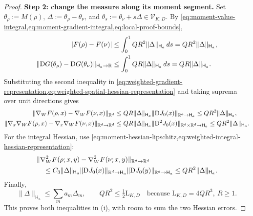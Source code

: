 \begin{proof}
\noindent\textbf{Step 2: change the measure along its moment segment.}
Set $\theta_\rho:=M(\rho)$, $\Delta:=\theta_\rho-\theta_\nu$, and
$\theta_s:=\theta_\nu+s\Delta\in\mathcal V_{K,D}$. By
\cref{eq:moment-value-integral,eq:moment-gradient-integral,eq:local-proof-bounds},
\begin{align*}
 |F(\rho)-F(\nu)|
 &\le\int_0^1QR^2\|\Delta\|_{\mathsf H_a}\,ds
  =QR^2\|\Delta\|_{\mathsf H_a},\\
 \|\mathrm{D} G(\theta_\rho)-\mathrm{D} G(\theta_\nu)\|_{\mathsf H_a\to\mathbb R}
 &\le\int_0^1QR\|\Delta\|_{\mathsf H_a}\,ds
  =QR\|\Delta\|_{\mathsf H_a}.
\end{align*}
Substituting the second inequality in
\cref{eq:weighted-gradient-representation,eq:weighted-spatial-hessian-representation}
and taking suprema over unit directions gives
\[
\begin{aligned}
 \|\nabla_WF(\rho,x)-\nabla_WF(\nu,x)\|_{\mathbb R^d}
 &\le QR\|\Delta\|_{\mathsf H_a}\|\mathrm{D} J_0(x)\|_{\mathbb R^d\to\mathsf H_a}
  \le QR^2\|\Delta\|_{\mathsf H_a},\\
 \|\nabla_x\nabla_WF(\rho,x)-\nabla_x\nabla_WF(\nu,x)\|_{\mathbb R^d\to\mathbb R^d}
 &\le QR\|\Delta\|_{\mathsf H_a}\|\mathrm{D}^2J_0(x)\|_{\mathbb R^d\times\mathbb R^d\to\mathsf H_a}
  \le QR^2\|\Delta\|_{\mathsf H_a}.
\end{aligned}
\]
For the integral Hessian, use
\cref{eq:moment-hessian-lipschitz,eq:weighted-integral-hessian-representation}:
\[
\begin{aligned}
 &\|\nabla_W^2F(\rho;x,y)-\nabla_W^2F(\nu;x,y)\|_{\mathbb R^d\to\mathbb R^d}\\
 &\quad\le C_3\|\Delta\|_{\mathsf H_a}
       \|\mathrm{D} J_0(x)\|_{\mathbb R^d\to\mathsf H_a}
       \|\mathrm{D} J_0(y)\|_{\mathbb R^d\to\mathsf H_a}
 \le QR^2\|\Delta\|_{\mathsf H_a}.
\end{aligned}
\]
Finally,
\[
 \|\Delta\|_{\mathsf H_a}\le\sum_m a_m\Delta_m,
 \qquad QR^2\le\tfrac12\mathrm L_{K,D}
 \quad\text{because }\mathrm L_{K,D}=4QR^3,\ R\ge1.
\]
This proves both inequalities in (i), with room to sum the two Hessian errors.


\end{proof}
